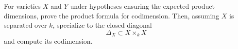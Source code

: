 \begin{problem}\label{chal:vi31-04}
For varieties \(X\) and \(Y\) under hypotheses ensuring the expected product dimensions, prove the product formula for codimension. Then, assuming \(X\) is separated over \(k\), specialize to the closed diagonal
\[
\Delta_X\subset X\times_kX
\]
and compute its codimension.
\end{problem}
